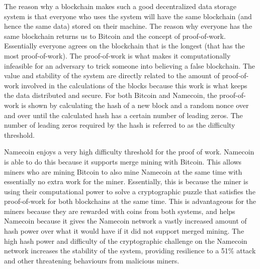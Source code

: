 The reason  why a blockchain makes such a good decentralized data storage system is that everyone who uses the system will have the same blockchain (and hence the same data) stored on their machine. The reason why everyone has the same blockchain returns us to Bitcoin and the concept of proof-of-work. Essentially everyone agrees on the blockchain that is the longest (that has the most proof-of-work). The proof-of-work is what makes it computationally infeasible for an adversary to trick someone into believing a false blockchain. The value and stability of the system are directly related to the amount of proof-of-work involved in the calculations of the blocks because this work is what keeps the data distributed and secure. For both Bitcoin and Namecoin, the proof-of-work is shown by calculating the hash of a new block and a random nonce over and over until the calculated hash has a certain number of leading zeros. The number of leading zeros required by the hash is referred to as the difficulty threshold. 

Namecoin enjoys a very high difficulty threshold for the proof of work. Namecoin is able to do this because it supports merge mining with Bitcoin. This allows miners who are mining Bitcoin to also mine Namecoin at the same time with essentially no extra work for the miner. Essentially, this is because the miner is using their computational power to solve a cryptographic puzzle that satisfies the proof-of-work for both blockchains at the same time. This is advantageous for the miners because they are rewarded with coins from both systems, and helps Namecoin because it gives the Namecoin network a vastly increased amount of hash power over what it would have if it did not support merged mining. The high hash power and difficulty of the cryptographic challenge on the Namecoin network increases the stability of the system, providing resilience to a 51\% attack and other threatening behaviours from malicious miners. 


